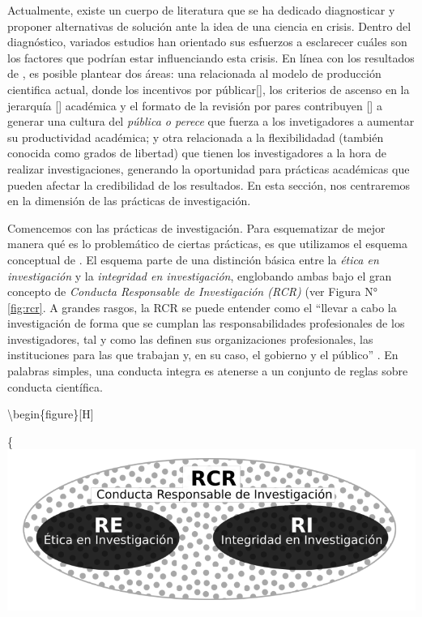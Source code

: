 \documentclass[
]{book}
\begin{document}
Actualmente, existe un cuerpo de literatura que se ha dedicado diagnosticar y proponer alternativas de solución ante la idea de una ciencia en crisis. Dentro del diagnóstico, variados estudios han orientado sus esfuerzos a esclarecer cuáles son los factores que podrían estar influenciando esta crisis. En línea con los resultados de \citet{baker_500_2016}, es posible plantear dos áreas: una relacionada al modelo de producción cientifica actual, donde los incentivos por públicar{[}{]}, los criterios de ascenso en la jerarquía {[}{]} académica y el formato de la revisión por pares contribuyen {[}{]} a generar una cultura del \emph{pública o perece} que fuerza a los invetigadores a aumentar su productividad académica; y otra relacionada a la flexibilidadad (también conocida como grados de libertad) que tienen los investigadores a la hora de realizar investigaciones, generando la oportunidad para prácticas académicas que pueden afectar la credibilidad de los resultados. En esta sección, nos centraremos en la dimensión de las prácticas de investigación.

Comencemos con las prácticas de investigación. Para esquematizar de mejor manera qué es lo problemático de ciertas prácticas, es que utilizamos el esquema conceptual de \citet{steneck_Fostering_2006}. El esquema parte de una distinción básica entre la \emph{ética en investigación} y la \emph{integridad en investigación}, englobando ambas bajo el gran concepto de \emph{Conducta Responsable de Investigación (RCR)} (ver Figura N° \ref{fig:rcr}. A grandes rasgos, la RCR se puede entender como el ``llevar a cabo la investigación de forma que se cumplan las responsabilidades profesionales de los investigadores, tal y como las definen sus organizaciones profesionales, las instituciones para las que trabajan y, en su caso, el gobierno y el público'' \citep{steneck_Fostering_2006}. En palabras simples, una conducta integra es atenerse a un conjunto de reglas sobre conducta científica.

\textbackslash begin\{figure\}{[}H{]}

\{\centering \includegraphics[width=1\linewidth]{docs/images/rcr}
\end{document}
